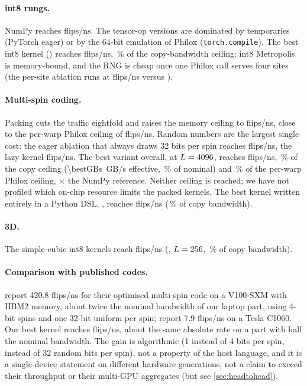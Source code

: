\documentclass[11pt]{article}
\begin{document}
\paragraph{int8 rungs.} NumPy reaches \numpyFlips{} flips/ns. The tensor-op versions are
dominated by temporaries (PyTorch eager) or by the 64-bit emulation of Philox (\texttt{torch.compile}).
The best int8 kernel (\bestIntBackend) reaches \bestIntFlips{} flips/ns, \bestIntPctCopy\,\% of
the copy-bandwidth ceiling: int8 Metropolis is memory-bound, and the RNG is cheap once one Philox
call serves four sites (the per-site ablation runs at \ablPerSite{} flips/ns versus \ablCudaInt{}).

\paragraph{Multi-spin coding.} Packing cuts the traffic eightfold and raises the memory ceiling
to \memCeilMsc{} flips/ns, close to the per-warp Philox ceiling of \rngCeilMscWarp{} flips/ns.
Random numbers are the largest single cost: the eager ablation that always draws 32 bits per spin
reaches \ablEager{} flips/ns, the lazy kernel \ablLazy{} flips/ns. The best variant overall,
\bestBackend{} at $L=4096$, reaches \bestFlips{} flips/ns, \bestPctCopy\,\% of the copy
ceiling (\SI{\bestGBs}{GB/s} effective, \bestPctSpec\,\% of nominal) and \bestPctRngWarp\,\% of
the per-warp Philox ceiling, \speedupVsNumpy$\times$ the NumPy reference. Neither ceiling is
reached; we have not profiled which on-chip resource limits the packed kernels. The best kernel written entirely in a Python DSL, \bestPyBackend{}, reaches
\bestPyFlips{} flips/ns (\bestPyPctCopy\,\% of copy bandwidth).

\paragraph{3D.} The simple-cubic int8 kernels reach \bestThreeFlips{} flips/ns
(\bestThreeBackend, $L=256$, \bestThreePct\,\% of copy bandwidth).

\paragraph{Comparison with published codes.} \citet{Romero2020} report 420.8 flips/ns for their
optimised multi-spin code on a V100-SXM with HBM2 memory, about twice the nominal bandwidth of
our laptop part, using 4-bit spins and one 32-bit uniform per spin; \citet{Block2010} report
7.9 flips/ns on a Tesla C1060. Our best kernel reaches \bestFlips{} flips/ns, about the same
absolute rate on a part with half the nominal bandwidth. The gain is algorithmic (1 instead of
4 bits per spin, \bitsPerSpinWarp{} instead of 32 random bits per spin), not a property of the
host language, and it is a single-device statement on different hardware generations, not a
claim to exceed their throughput or their multi-GPU aggregates (but see
\cref{sec:headtohead}).
\end{document}
